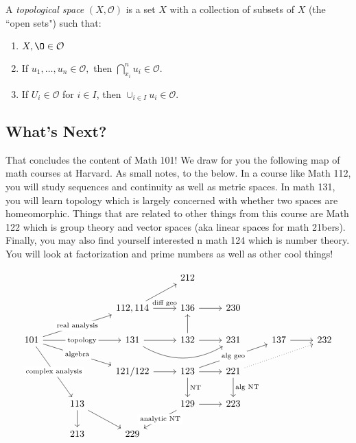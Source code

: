 \begin{definition}
A \textit{topological space} $(X, \mathcal{O})$ is a set $X$ with a collection of subsets of $X$ (the ``open sets") such that:
\begin{enumerate}
    \item $X, \O \in \mathcal{O}$
    \item If $u_1, \dots, u_n \in \mathcal{O},$ then $\bigcap_{x_i}^nu_i \in \mathcal{O}$.
    \item If $U_i \in \mathcal{O}$ for $i \in I$, then $\cup_{i\in I}u_i \in \mathcal{O}$.
\end{enumerate}
\end{definition}

\subsection{What's Next?}
That concludes the content of Math 101! We draw for you the following map of math courses at Harvard. As small notes, to the below. In a course like Math 112, you will study sequences and continuity as well as metric spaces. In math 131, you will learn topology which is largely concerned with whether two spaces are homeomorphic. Things that are related to other things from this course are Math 122 which is group theory and vector spaces (aka linear spaces for math 21bers). Finally, you may also find yourself interested n math 124 which is number theory. You will look at factorization and prime numbers as well as other cool things!

\[\begin{tikzcd}
 & & & 212 & & &     \\
 & & {112, 114} \arrow[ru] \arrow[r, "\text{diff geo}"] & 136 \arrow[r] & 230 & & \\
\text{101} \arrow[rru, "\text{real analysis}" description] \arrow[rr, "\text{topology}" description] \arrow[rrd, "\text{algebra}" description] \arrow[rdd, "\text{complex analysis}" description] & & 131 \arrow[r] \arrow[rr, bend right] & 132 \arrow[r] \arrow[u] & 231 & 137 \arrow[r] & 232 \\
 & & 121/122 \arrow[r] & 123 \arrow[r] \arrow[d, "\text{NT}"] \arrow[rru, "\text{alg geo}" description] & 221 \arrow[d, "\text{alg NT}"] \arrow[rru, dotted] & & \\
 & 113 \arrow[d] \arrow[rd] & & 129 \arrow[r] \arrow[ld, "\text{analytic NT}" description] & 223 & & \\
 & 213 & 229 & & & &
\end{tikzcd}\]